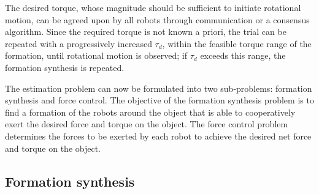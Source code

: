 The desired torque, whose magnitude should be sufficient to initiate rotational motion, can be agreed upon by all robots through communication or a consensus algorithm. Since the required torque is not known a priori, the trial can be repeated with a progressively increased $\tau_d$, within the feasible torque range of the formation, until rotational motion is observed; if $\tau_d$ exceeds this range, the formation synthesis is repeated.

The estimation problem can now be formulated into two sub-problems: formation synthesis and force control. The objective of the formation synthesis problem is to find a formation of the robots around the object that is able to cooperatively exert the desired force and torque on the object. The force control problem determines the forces to be exerted by each robot to achieve the desired net force and torque on the object.

\subsection{Formation synthesis}

